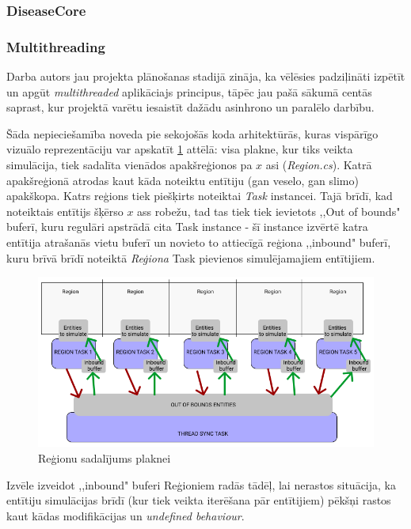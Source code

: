 \subsubsection{DiseaseCore}
\subsubsection*{Multithreading}
Darba autors jau projekta plānošanas stadijā zināja, ka vēlēsies padziļināti
izpētīt un apgūt \emph{multithreaded} aplikāciajs principus, tāpēc jau pašā sākumā
centās saprast, kur projektā varētu iesaistīt dažādu asinhrono un paralēlo darbību.

Šāda nepieciešamība noveda pie sekojošās koda arhitektūrās, kuras vispārīgo
vizuālo reprezentāciju var apskatīt \ref{img:multithreaded-layout} attēlā: visa plakne, kur tiks
veikta simulācija, tiek sadalīta vienādos apakšreģionos pa \(x\) asi (\emph{Region.cs}).
Katrā apakšreģionā atrodas kaut kāda noteiktu entītiju (gan veselo, gan slimo) apakškopa.
Katrs reģions tiek piešķirts noteiktai \emph{Task}\cite{csharp:task} instancei.
Tajā brīdī, kad noteiktais entītijs šķērso \(x\) ass robežu, tad tas tiek tiek
ievietots ,,Out of bounds" buferī, kuru regulāri apstrādā cita Task instance - šī instance
izvērtē katra entītija atrašanās vietu buferī un novieto to attiecīgā reģiona
,,inbound" buferī, kuru brīvā brīdī noteiktā \emph{Reģiona} Task pievienos
simulējamajiem entītijiem.


\begin{figure}[H]
	\centering
	\includegraphics[scale=0.5]{images/multithreaded-layout.png}
	\caption{Reģionu sadalījums plaknei}
	\label{img:multithreaded-layout}
\end{figure}


Izvēle izveidot ,,inbound" buferi Reģioniem radās tādēļ, lai nerastos situācija,
ka entītiju simulācijas brīdī (kur tiek veikta iterēšana pār entītijiem) pēkšņi
rastos kaut kādas modifikācijas un \emph{undefined behaviour}.

